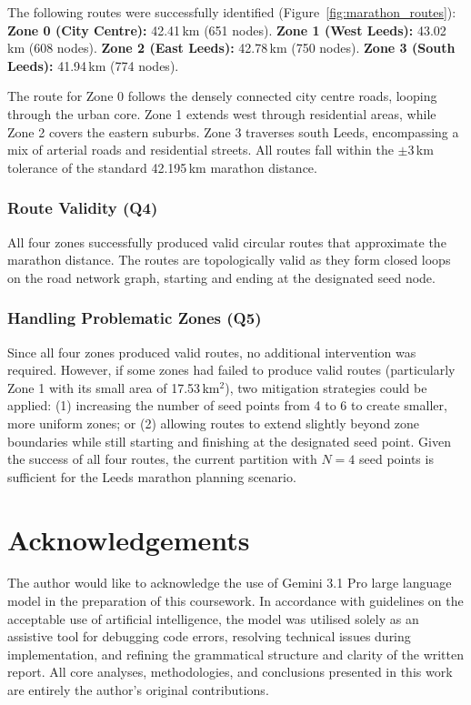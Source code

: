 \documentclass[conference]{IEEEtran}
\begin{document}
The following routes were successfully identified (Figure~\ref{fig:marathon_routes}):
\textbf{Zone 0 (City Centre):} 42.41\,km (651 nodes).
\textbf{Zone 1 (West Leeds):} 43.02\,km (608 nodes).
\textbf{Zone 2 (East Leeds):} 42.78\,km (750 nodes).
\textbf{Zone 3 (South Leeds):} 41.94\,km (774 nodes).

The route for Zone 0 follows the densely connected city centre roads, looping through the urban core. Zone 1 extends west through residential areas, while Zone 2 covers the eastern suburbs. Zone 3 traverses south Leeds, encompassing a mix of arterial roads and residential streets. All routes fall within the $\pm 3$\,km tolerance of the standard 42.195\,km marathon distance.

\subsubsection{Route Validity (Q4)}
All four zones successfully produced valid circular routes that approximate the marathon distance. The routes are topologically valid as they form closed loops on the road network graph, starting and ending at the designated seed node.

\subsubsection{Handling Problematic Zones (Q5)}
Since all four zones produced valid routes, no additional intervention was required. However, if some zones had failed to produce valid routes (particularly Zone 1 with its small area of 17.53\,km$^2$), two mitigation strategies could be applied: (1) increasing the number of seed points from 4 to 6 to create smaller, more uniform zones; or (2) allowing routes to extend slightly beyond zone boundaries while still starting and finishing at the designated seed point. Given the success of all four routes, the current partition with $N=4$ seed points is sufficient for the Leeds marathon planning scenario.

\section*{Acknowledgements}
The author would like to acknowledge the use of Gemini 3.1 Pro large language model in the preparation of this coursework. In accordance with guidelines on the acceptable use of artificial intelligence, the model was utilised solely as an assistive tool for debugging code errors, resolving technical issues during implementation, and refining the grammatical structure and clarity of the written report. All core analyses, methodologies, and conclusions presented in this work are entirely the author's original contributions.
\end{document}
